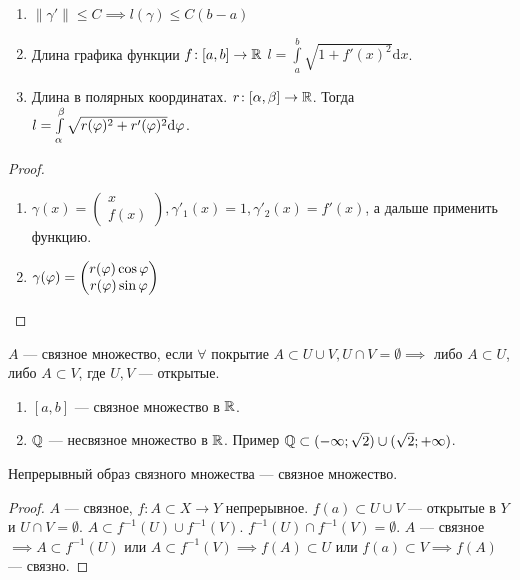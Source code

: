 \begin{consequence}
    \begin{enumerate}
        \item $\| \gamma' \| \le C \implies l(\gamma) \le C(b-a)$
        \item Длина графика функции $f\!: [a, b] \to \mathbb{R}$  $l = \int\limits_a^b \sqrt{1 + f'(x)^2} \mathrm{d}x$.
        \item Длина в полярных координатах. $r\!: [\alpha, \beta] \to \mathbb{R}$. Тогда  $l = \int\limits_\alpha^\beta \sqrt{r(\varphi)^2 + r'(\varphi)^2} \mathrm{d}\varphi$. 
    \end{enumerate}
\end{consequence}
\begin{proof}
    \begin{enumerate}
        \addtocounter{enumi}{1}
        \item $\gamma(x) = \begin{pmatrix} x \\ f(x) \end{pmatrix}, \gamma'_1(x) = 1, \gamma'_2(x) = f'(x)$, а дальше применить функцию.
        \item $\gamma(\varphi) = \begin{pmatrix} r(\varphi)\cos \varphi \\ r(\varphi) \sin \varphi \end{pmatrix} $
    \end{enumerate}
\end{proof}
\begin{definition}
    $A$ --- связное множество, если  $\forall$ покрытие  $A \subset U \cup V, U \cap V = \emptyset \implies $ либо  $A \subset U$, либо  $A \subset V$, где $U, V$ --- открытые.
\end{definition}
\begin{example}
    \begin{enumerate}
        \item $[a, b]$ --- связное множество в  $\mathbb{R}$.
        \item  $\mathbb{Q}$ --- несвязное множество в  $\mathbb{R}$. Пример  $\mathbb{Q} \subset (-\infty; \sqrt{2}) \cup (\sqrt{2}; +\infty)$.
    \end{enumerate}
\end{example}
\begin{theorem}
    Непрерывный образ связного множества --- связное множество.
\end{theorem}
\begin{proof}
    $A$ --- связное,  $f\!: A \subset X \to Y$ непрерывное.  $f(a) \subset U \cup V$ --- открытые в  $Y$ и  $U \cap V = \emptyset$.  $A \subset f^{-1}(U) \cup f^{-1}(V)$.  $f^{-1}(U) \cap f^{-1}(V) = \emptyset$.  $A$ --- связное  $\implies A \subset f^{-1}(U)$ или  $A \subset f^{-1}(V) \implies f(A) \subset U$ или  $f(a) \subset V \implies f(A)$ --- связно.
\end{proof}

